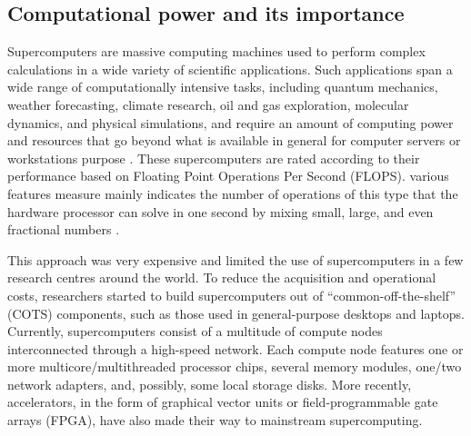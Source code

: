 \documentclass[11pt, letterpaper, english]{article}
\begin{document}
   
\subsection{Computational power and its importance}
    
\par{Supercomputers are massive computing machines used to perform complex calculations in a wide variety of scientific applications. Such applications span a wide range of computationally intensive tasks, including quantum mechanics, weather forecasting, climate research, oil and gas exploration, molecular dynamics, and physical simulations, and require an amount of computing power and resources that go beyond what is available in general for  computer servers or workstations purpose \cite{(R. Gioiosand a 2017)}. These supercomputers are rated according to their performance based on Floating Point Operations Per Second (FLOPS). various features measure mainly indicates the number of operations of this type that the hardware processor can solve in one second by mixing small, large, and even fractional numbers \cite{(McDonell, 2013)}.}

\par{This approach was very expensive and limited the use of supercomputers in a few research centres around the world. To reduce the acquisition and operational costs, researchers started to build supercomputers out of “common-off-the-shelf” (COTS) components, such as those used in general-purpose desktops and laptops. Currently, supercomputers consist of a multitude of compute nodes interconnected through a high-speed network. Each compute node features one or more multicore/multithreaded processor chips, several memory modules, one/two network adapters, and, possibly, some local storage disks. More recently, accelerators, in the form of graphical vector units or field-programmable gate arrays (FPGA), have also made their way to mainstream supercomputing.}
\end{document}
